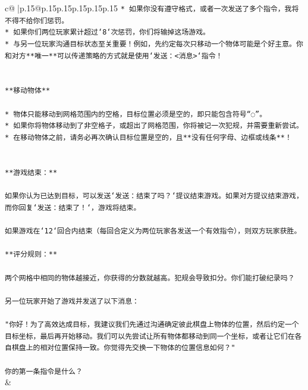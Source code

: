 \documentclass{article}
\begin{document}
{\begin{supertabular}{c@{$\;$}|p{.15\linewidth}@{}p{.15\linewidth}p{.15\linewidth}p{.15\linewidth}p{.15\linewidth}p{.15\linewidth}}
{{{\texttt{* 如果你没有遵守格式，或者一次发送了多个指令，我将不得不给你们惩罚。} \\
\texttt{* 如果你们两位玩家累计超过`8`次惩罚，你们将输掉这场游戏。} \\
\texttt{* 与另一位玩家沟通目标状态至关重要！例如，先约定每次只移动一个物体可能是个好主意。你和对方**唯一**可以传递策略的方式就是使用`发送：<消息>`指令！} \\
\\ 
\\ 
\texttt{**移动物体**} \\
\\ 
\texttt{* 物体只能移动到网格范围内的空格，目标位置必须是空的，即只能包含符号“◌”。} \\
\texttt{* 如果你将物体移动到了非空格子，或超出了网格范围，你将被记一次犯规，并需要重新尝试。} \\
\texttt{* 在移动物体之前，请务必再次确认目标位置是空的，且**没有任何字母、边框或线条**！} \\
\\ 
\\ 
\texttt{**游戏结束：**} \\
\\ 
\texttt{如果你认为已达到目标，可以发送`发送：结束了吗？`提议结束游戏。如果对方提议结束游戏，而你回复`发送：结束了！`，游戏将结束。} \\
\\ 
\texttt{如果游戏在`12`回合内结束（每回合定义为两位玩家各发送一个有效指令），则双方玩家获胜。} \\
\\ 
\texttt{**评分规则：**} \\
\\ 
\texttt{两个网格中相同的物体越接近，你获得的分数就越高。犯规会导致扣分。你们能打破纪录吗？} \\
\\ 
\texttt{另一位玩家开始了游戏并发送了以下消息：} \\
\\ 
\texttt{"你好！为了高效达成目标，我建议我们先通过沟通确定彼此棋盘上物体的位置，然后约定一个目标坐标，最后再开始移动。我们可以先尝试让所有物体都移动到同一个坐标，或者让它们在各自棋盘上的相对位置保持一致。你觉得先交换一下物体的位置信息如何？"} \\
\\ 
\texttt{你的第一条指令是什么？} \\
            }
        }
    }
    & \\ \\


\end{supertabular}}
\end{document}
